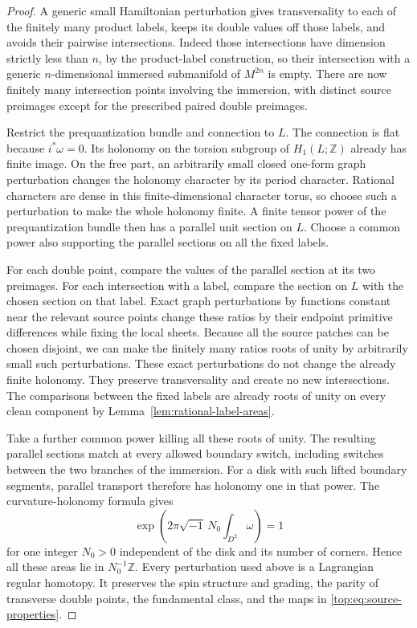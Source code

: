 \documentclass[11pt]{article}
\numberwithin{equation}{section}
\theoremstyle{definition}
\theoremstyle{remark}
\begin{document}
\begin{proof}
A generic small Hamiltonian perturbation gives
transversality to each of the finitely many product labels,
keeps its double values off those labels, and avoids their
pairwise intersections.  Indeed those intersections have
dimension strictly less than $n$, by the product-label
construction, so their intersection with a generic
$n$-dimensional immersed submanifold of $M^{2n}$ is empty.
There are now finitely many intersection points involving
the immersion, with distinct source preimages except for
the prescribed paired double preimages.

Restrict the prequantization bundle and connection to
$L$.  The connection is flat because $i^*\omega=0$.
Its holonomy on the torsion subgroup of $H_1(L;\mathbb Z)$
already has finite image.  On the free part, an arbitrarily
small closed one-form graph perturbation changes the
holonomy character by its period character.  Rational
characters are dense in this finite-dimensional character
torus, so choose such a perturbation to make the whole
holonomy finite.  A finite tensor power of the
prequantization bundle then has a parallel unit section
on $L$.  Choose a common power also supporting the
parallel sections on all the fixed labels.

For each double point, compare the values of the
parallel section at its two preimages.  For each
intersection with a label, compare the section on $L$
with the chosen section on that label.  Exact graph
perturbations by functions constant near the relevant
source points change these ratios by their endpoint
primitive differences while fixing the local sheets.
Because all the source patches can be chosen disjoint,
we can make the finitely many ratios roots of unity by
arbitrarily small such perturbations.  These exact
perturbations do not change the already finite holonomy.
They preserve transversality and create no new
intersections.  The comparisons between the fixed
labels are already roots of unity on every clean
component by Lemma~\ref{lem:rational-label-areas}.

Take a further common power killing all these roots of
unity.  The resulting parallel sections match at every
allowed boundary switch, including switches between
the two branches of the immersion.  For a disk with
such lifted boundary segments, parallel transport
therefore has holonomy one in that power.  The
curvature-holonomy formula gives
\[
                 \exp\left(2\pi\sqrt{-1}\,N_0
                         \int_{D^2}\omega\right)=1
\]
for one integer $N_0>0$ independent of the disk and its
number of corners.  Hence all these areas lie in
$N_0^{-1}\mathbb Z$.  Every perturbation used above is a
Lagrangian regular homotopy.  It preserves the spin
structure and grading, the parity of transverse
double points, the fundamental class, and the maps in
\eqref{top:eq:source-properties}.
\end{proof}
\end{document}
